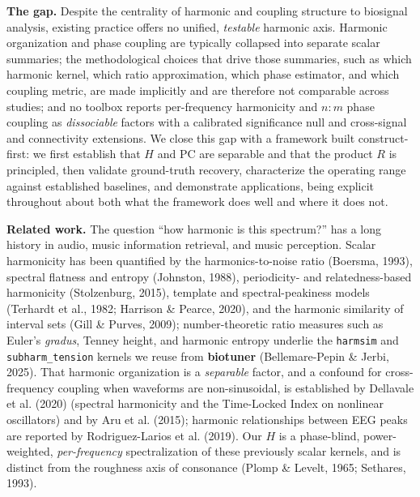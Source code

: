 \documentclass[11pt]{article}
\begin{document}
\textbf{The gap.} Despite the centrality of harmonic and coupling structure to biosignal analysis, existing practice offers no unified, \emph{testable} harmonic axis. Harmonic organization and phase coupling are typically collapsed into separate scalar summaries; the methodological choices that drive those summaries, such as which harmonic kernel, which ratio approximation, which phase estimator, and which coupling metric, are made implicitly and are therefore not comparable across studies; and no toolbox reports per-frequency harmonicity and $n{:}m$ phase coupling as \emph{dissociable} factors with a calibrated significance null and cross-signal and connectivity extensions. We close this gap with a framework built construct-first: we first establish that $H$ and $\mathrm{PC}$ are separable and that the product $R$ is principled, then validate ground-truth recovery, characterize the operating range against established baselines, and demonstrate applications, being explicit throughout about both what the framework does well and where it does not.

\textbf{Related work.} The question ``how harmonic is this spectrum?'' has a long history in audio, music information retrieval, and music perception. Scalar harmonicity has been quantified by the harmonics-to-noise ratio (Boersma, 1993), spectral flatness and entropy (Johnston, 1988), periodicity- and relatedness-based harmonicity (Stolzenburg, 2015), template and spectral-peakiness models (Terhardt et al., 1982; Harrison \& Pearce, 2020), and the harmonic similarity of interval sets (Gill \& Purves, 2009); number-theoretic ratio measures such as Euler's \emph{gradus}, Tenney height, and harmonic entropy underlie the \texttt{harmsim} and \texttt{subharm\_tension} kernels we reuse from \textbf{biotuner} (Bellemare-Pepin \& Jerbi, 2025). That harmonic organization is a \emph{separable} factor, and a confound for cross-frequency coupling when waveforms are non-sinusoidal, is established by Dellavale et al. (2020) (spectral harmonicity and the Time-Locked Index on nonlinear oscillators) and by Aru et al. (2015); harmonic relationships between EEG peaks are reported by Rodriguez-Larios et al. (2019). Our $H$ is a phase-blind, power-weighted, \emph{per-frequency} spectralization of these previously scalar kernels, and is distinct from the roughness axis of consonance (Plomp \& Levelt, 1965; Sethares, 1993).
\end{document}
